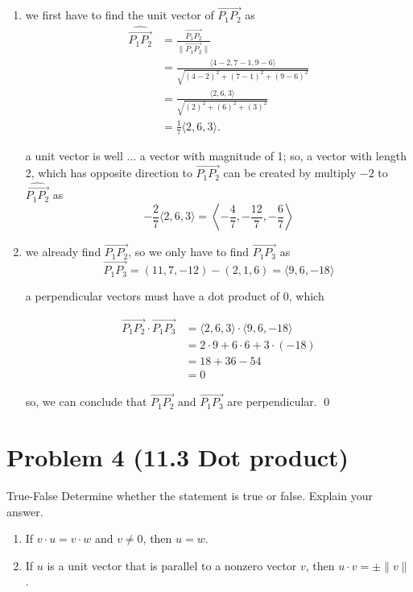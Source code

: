 \documentclass{article}
\theoremstyle{remark}
\begin{document}
\begin{enumerate}[label= (\alph*)]
    \item we first have to find the unit vector of $\overrightarrow{P_1P_2}$ as
    \[
        \begin{aligned}
            \widehat{\overrightarrow{P_1P_2}} &= \frac{\overrightarrow{P_1P_2}}{\lVert \overrightarrow{P_1P_2} \rVert} \\
            &= \frac{\langle 4 - 2, 7 - 1, 9 - 6 \rangle}{\sqrt{(4 - 2)^2 + (7 - 1)^2 + (9 - 6)^2}} \\
            &= \frac{\langle 2, 6, 3 \rangle}{\sqrt{(2)^2 + (6)^2 + (3)^2}} \\
            &= \frac{1}{7} \langle 2, 6, 3 \rangle.
        \end{aligned}
    \]


    a unit vector is well ... a vector with magnitude of 1; so, a vector with length 2, which has opposite direction to $\overrightarrow{P_1P_2}$ can be created by multiply $-2$ to $\widehat{\overrightarrow{P_1P_2}}$ as
    \[
        \boxed{-\frac{2}{7} \langle 2, 6, 3 \rangle = \left\langle -\frac{4}{7}, -\frac{12}{7}, -\frac{6}{7} \right\rangle}
    \]

    \newpage
    \item we already find $\overrightarrow{P_1P_2}$, so we only have to find $\overrightarrow{P_1P_3}$ as
    \[
        \overrightarrow{P_1P_3} = (11, 7, -12) - (2, 1, 6) = \langle 9, 6, -18 \rangle
    \]

    a perpendicular vectors must have a dot product of 0, which 

    \[
        \begin{aligned}
            \overrightarrow{P_1P_2} \cdot \overrightarrow{P_1P_3} &= \langle 2, 6, 3 \rangle \cdot \langle 9, 6, -18 \rangle \\
            &= 2 \cdot 9 + 6 \cdot 6 + 3 \cdot (-18) \\
            &= 18 + 36 - 54 \\
            &= 0
        \end{aligned}
    \]

    so, we can conclude that $\overrightarrow{P_1P_2} \text{ and } \overrightarrow{P_1P_3}$ are perpendicular. 
    \qed
\end{enumerate}

\vspace{1em}
\hrulefill

\section*{Problem 4 (11.3 Dot product)}
True-False Determine whether the statement is true or false. Explain your answer.
\begin{enumerate}[label=(\alph*)]
    \item If $v \cdot u = v \cdot w$ and $v \neq 0$, then $u = w$.
    \item If $u$ is a unit vector that is parallel to a nonzero vector $v$, then $u \cdot v = \pm \lVert v \rVert$.
\end{enumerate}
\end{document}
